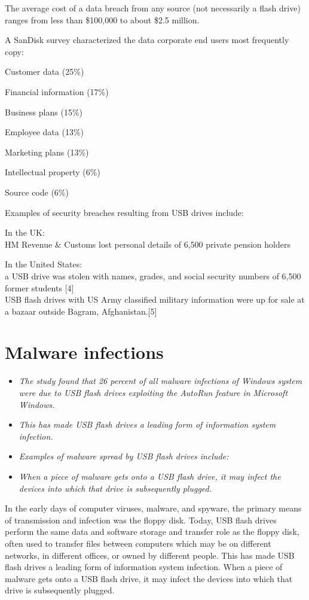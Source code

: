 The average cost of a data breach from any source (not necessarily a
flash drive) ranges from less than \$100,000 to about \$2.5 million.

A SanDisk survey characterized the data corporate end users most
frequently copy:

Customer data (25\%)

Financial information (17\%)

Business plans (15\%)

Employee data (13\%)

Marketing plans (13\%)

Intellectual property (6\%)

Source code (6\%)

Examples of security breaches resulting from USB drives include:

In the UK:\\
HM Revenue \& Customs lost personal details of 6,500 private pension
holders

In the United States:\\
a USB drive was stolen with names, grades, and social security numbers
of 6,500 former students {[}4{]}\\
USB flash drives with US Army classified military information were up
for sale at a bazaar outside Bagram, Afghanistan.{[}5{]}

\section{Malware infections}\label{malware-infections}

\begin{itemize}
\item
  \emph{The study found that 26 percent of all malware infections of
  Windows system were due to USB flash drives exploiting the AutoRun
  feature in Microsoft Windows.}
\item
  \emph{This has made USB flash drives a leading form of information
  system infection.}
\item
  \emph{Examples of malware spread by USB flash drives include:}
\item
  \emph{When a piece of malware gets onto a USB flash drive, it may
  infect the devices into which that drive is subsequently plugged.}
\end{itemize}

In the early days of computer viruses, malware, and spyware, the primary
means of transmission and infection was the floppy disk. Today, USB
flash drives perform the same data and software storage and transfer
role as the floppy disk, often used to transfer files between computers
which may be on different networks, in different offices, or owned by
different people. This has made USB flash drives a leading form of
information system infection. When a piece of malware gets onto a USB
flash drive, it may infect the devices into which that drive is
subsequently plugged.

